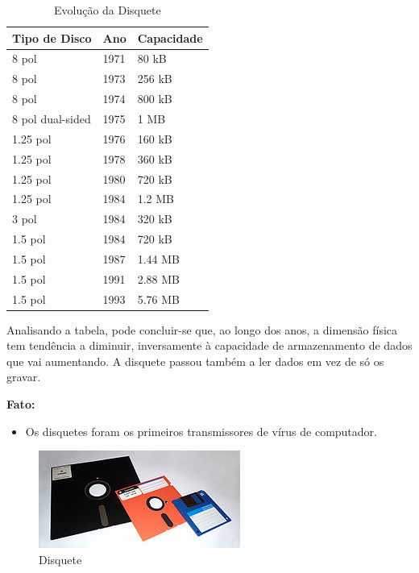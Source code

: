\documentclass{report}
\begin{document}
	\begin{table}[h]
		\centering
		\caption{Evolução da Disquete}
		\label{my-label}
		\begin{tabular}{|l|l|l|}
		\hline
		\textbf{Tipo de Disco} & \textbf{Ano} & \textbf{Capacidade} \\ \hline
		8 pol            & 1971 & 80 kB   \\ \hline
		8 pol            & 1973 & 256 kB  \\ \hline
		8 pol            & 1974 & 800 kB  \\ \hline
		8 pol dual-sided & 1975 & 1 MB    \\ \hline
		1.25 pol         & 1976 & 160 kB  \\ \hline
		1.25 pol         & 1978 & 360 kB  \\ \hline
		1.25 pol         & 1980 & 720 kB  \\ \hline
		1.25 pol         & 1984 & 1.2 MB  \\ \hline
		3 pol            & 1984 & 320 kB  \\ \hline
		1.5 pol          & 1984 & 720 kB  \\ \hline
		1.5 pol          & 1987 & 1.44 MB \\ \hline
		1.5 pol          & 1991 & 2.88 MB \\ \hline
		1.5 pol          & 1993 & 5.76 MB \\ \hline
		
		\end{tabular}
		\end{table}		
 
	Analisando a tabela, pode concluir-se que, ao longo dos anos, a dimensão física tem tendência a diminuir, inversamente à capacidade de armazenamento de dados que vai aumentando. A disquete passou também a ler dados em vez de só os gravar. 

	\textbf{Fato:}	
		\begin{itemize}
		 	\item Os disquetes foram os primeiros transmissores de vírus de computador. 
	 	\end{itemize}
	
	
	\begin{figure} [h]
		\centering
		\includegraphics[scale=1]{disquete.jpg}
		\caption{Disquete}
	\end{figure}
	
\end{document}
